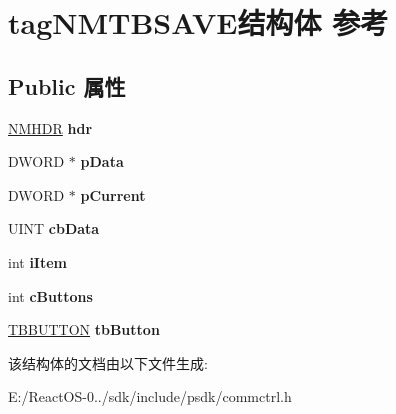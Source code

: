 \hypertarget{structtag_n_m_t_b_s_a_v_e}{}\section{tag\+N\+M\+T\+B\+S\+A\+V\+E结构体 参考}
\label{structtag_n_m_t_b_s_a_v_e}
\subsection*{Public 属性}
\begin{DoxyCompactItemize}
\item 
\mbox{\label{structtag_n_m_t_b_s_a_v_e_acc0b3eec905a6ba9daf5e6332c7d8cbc}} 
\hyperlink{structtag_n_m_h_d_r}{N\+M\+H\+DR} {\bfseries hdr}
\item 
\mbox{\label{structtag_n_m_t_b_s_a_v_e_a63190a6958f880fd3565cf821f7f2fcd}} 
D\+W\+O\+RD $\ast$ {\bfseries p\+Data}
\item 
\mbox{\label{structtag_n_m_t_b_s_a_v_e_ad608d690bdee4b18f08cc1212abd62e8}} 
D\+W\+O\+RD $\ast$ {\bfseries p\+Current}
\item 
\mbox{\label{structtag_n_m_t_b_s_a_v_e_a7d70e4453ec26cbd5a1292a0d4187265}} 
U\+I\+NT {\bfseries cb\+Data}
\item 
\mbox{\label{structtag_n_m_t_b_s_a_v_e_ac59356c5be7e104530ee71d32cab7637}} 
int {\bfseries i\+Item}
\item 
\mbox{\label{structtag_n_m_t_b_s_a_v_e_aefe23bf5742feca899992e9d32cc816e}} 
int {\bfseries c\+Buttons}
\item 
\mbox{\label{structtag_n_m_t_b_s_a_v_e_a6890446128aad7203190497110c11e2f}} 
\hyperlink{struct___t_b_b_u_t_t_o_n}{T\+B\+B\+U\+T\+T\+ON} {\bfseries tb\+Button}
\end{DoxyCompactItemize}


该结构体的文档由以下文件生成\+:\begin{DoxyCompactItemize}
\item 
E\+:/\+React\+O\+S-\/0../sdk/include/psdk/commctrl.\+h\end{DoxyCompactItemize}
